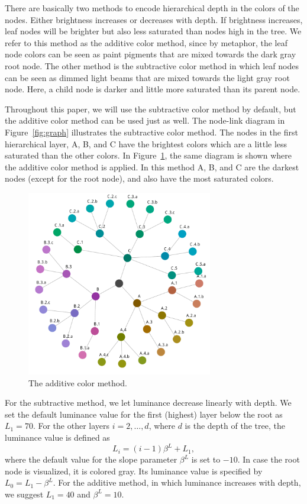 \documentclass[journal]{vgtc}                %
\begin{document}
There are basically two methods to encode hierarchical depth in the colors of the nodes. Either brightness increases or decreases with depth. If brightness increases, leaf nodes will be brighter but also less saturated than nodes high in the tree. We refer to this method as the additive color method, since by metaphor, the leaf node colors can be seen as paint pigments that are mixed towards the dark gray root node. The other method is the subtractive color method in which leaf nodes can be seen as dimmed light beams that are mixed towards the light gray root node. Here, a child node is darker and little more saturated than its parent node.

Throughout this paper, we will use the subtractive color method by default, but the additive color method can be used just as well. The node-link diagram in Figure~\ref{fig:graph} illustrates the subtractive color method. The nodes in the first hierarchical layer, A, B, and C have the brightest colors which are a little less saturated than the other colors. In Figure~\ref{fig:graphadd}, the same diagram is shown where the additive color method is applied. In this method A, B, and C are the darkest nodes (except for the root node), and also have the most saturated colors.

\begin{figure}[tb]
  \centering
  \includegraphics[width=3.2in]{HCPgraph3.pdf}
  \caption{The additive color method.}\label{fig:graphadd}
\end{figure}


For the subtractive method, we let luminance decrease linearly with depth. We set the default luminance value for the first (highest) layer below the root as $L_1=70$. For the other layers $i=2,\ldots, d$, where $d$ is the depth of the tree, the luminance value is defined as
\begin{equation}
L_i=(i-1)\beta^L + L_1,
\end{equation}
where the default value for the slope parameter $\beta^L$ is set to $-10$. In case the root node is visualized, it is colored gray. Its luminance value is specified by $L_0=L_1-\beta^L$. For the additive method, in which luminance increases with depth, we suggest $L_1=40$ and $\beta^L=10$. 
\end{document}
